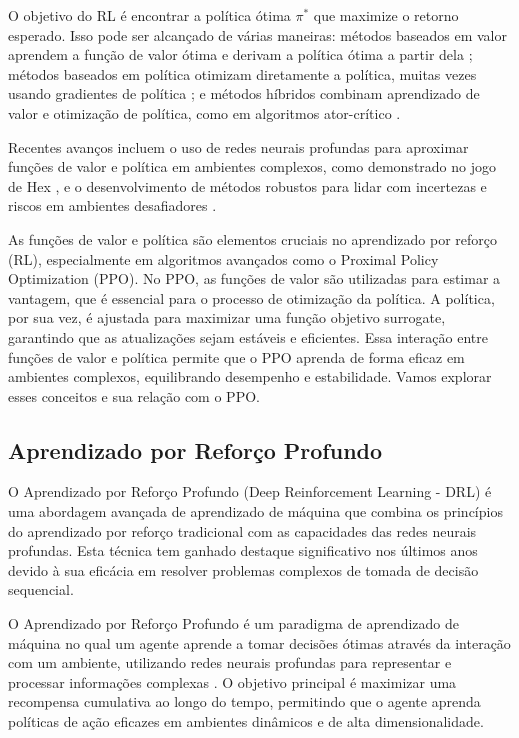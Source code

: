 O objetivo do RL é encontrar a política ótima \(\pi^*\) que maximize o retorno esperado. Isso pode ser alcançado de várias maneiras: métodos baseados em valor aprendem a função de valor ótima e derivam a política ótima a partir dela \cite{ Takada2020ReinforcementLT}; métodos baseados em política otimizam diretamente a política, muitas vezes usando gradientes de política \cite{ Liu2020OverviewOR}; e métodos híbridos combinam aprendizado de valor e otimização de política, como em algoritmos ator-crítico \cite{ yao2020smixlambdaenhancingcentralizedvalue}.

Recentes avanços incluem o uso de redes neurais profundas para aproximar funções de valor e política em ambientes complexos, como demonstrado no jogo de Hex \cite{ Takada2020ReinforcementLT}, e o desenvolvimento de métodos robustos para lidar com incertezas e riscos em ambientes desafiadores \cite{ Kim_2022}.

As funções de valor e política são elementos cruciais no aprendizado por reforço (RL), especialmente em algoritmos avançados como o Proximal Policy Optimization (PPO). No PPO, as funções de valor são utilizadas para estimar a vantagem, que é essencial para o processo de otimização da política. A política, por sua vez, é ajustada para maximizar uma função objetivo surrogate, garantindo que as atualizações sejam estáveis e eficientes. Essa interação entre funções de valor e política permite que o PPO aprenda de forma eficaz em ambientes complexos, equilibrando desempenho e estabilidade. Vamos explorar esses conceitos e sua relação com o PPO.



\subsection{Aprendizado por Reforço Profundo}
\label{subsec:deep_rl}

O Aprendizado por Reforço Profundo (Deep Reinforcement Learning - DRL) é uma abordagem avançada de aprendizado de máquina que combina os princípios do aprendizado por reforço tradicional com as capacidades das redes neurais profundas. Esta técnica tem ganhado destaque significativo nos últimos anos devido à sua eficácia em resolver problemas complexos de tomada de decisão sequencial.

O Aprendizado por Reforço Profundo é um paradigma de aprendizado de máquina no qual um agente aprende a tomar decisões ótimas através da interação com um ambiente, utilizando redes neurais profundas para representar e processar informações complexas \cite{Job2023TelemetriaAU, Kinoshita2022AprendizadoPR}. O objetivo principal é maximizar uma recompensa cumulativa ao longo do tempo, permitindo que o agente aprenda políticas de ação eficazes em ambientes dinâmicos e de alta dimensionalidade.

